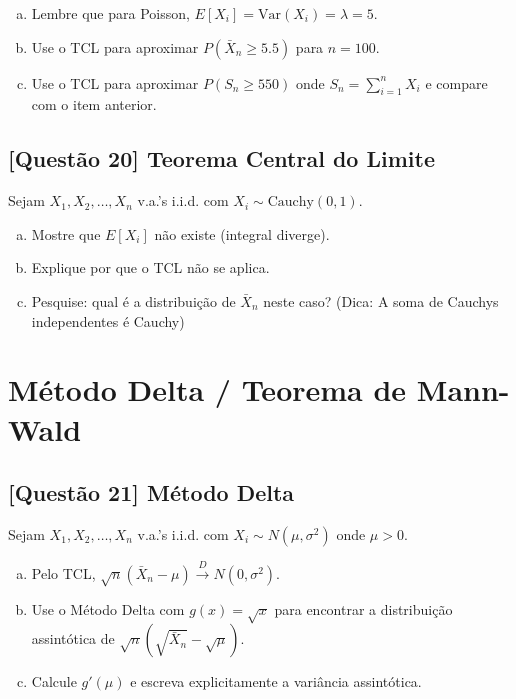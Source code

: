 \documentclass[12pt,a4paper]{article}
\begin{document}
\begin{enumerate}[(a)]
    \item Lembre que para Poisson, $E[X_i] = \text{Var}(X_i) = \lambda = 5$.
    \item Use o TCL para aproximar $P(\bar{X}_n \geq 5.5)$ para $n = 100$.
    \item Use o TCL para aproximar $P(S_n \geq 550)$ onde $S_n = \sum_{i=1}^n X_i$ e compare com o item anterior.
\end{enumerate}

\subsection*{[Questão 20] Teorema Central do Limite}

Sejam $X_1, X_2, \ldots, X_n$ v.a.'s i.i.d. com $X_i \sim \text{Cauchy}(0, 1)$.

\begin{enumerate}[(a)]
    \item Mostre que $E[X_i]$ não existe (integral diverge).
    \item Explique por que o TCL não se aplica.
    \item Pesquise: qual é a distribuição de $\bar{X}_n$ neste caso? (Dica: A soma de Cauchys independentes é Cauchy)
\end{enumerate}

\section{Método Delta / Teorema de Mann-Wald}

\subsection*{[Questão 21] Método Delta}

Sejam $X_1, X_2, \ldots, X_n$ v.a.'s i.i.d. com $X_i \sim N(\mu, \sigma^2)$ onde $\mu > 0$.

\begin{enumerate}[(a)]
    \item Pelo TCL, $\sqrt{n}(\bar{X}_n - \mu) \xrightarrow{D} N(0, \sigma^2)$.
    \item Use o Método Delta com $g(x) = \sqrt{x}$ para encontrar a distribuição assintótica de $\sqrt{n}(\sqrt{\bar{X}_n} - \sqrt{\mu})$.
    \item Calcule $g'(\mu)$ e escreva explicitamente a variância assintótica.
\end{enumerate}
\end{document}
